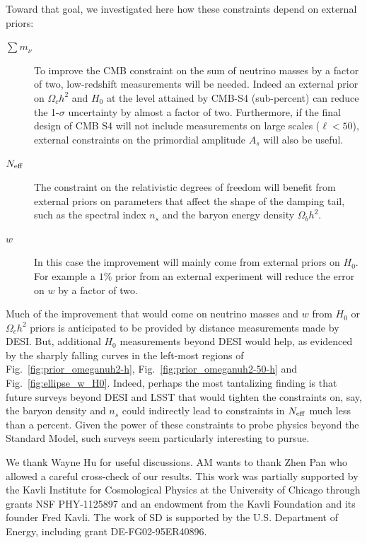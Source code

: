 \documentclass[aps,prd,reprint,superscriptaddress,nofootinbib]{revtex4-1}
\newcommand{\reffig}[1]{Fig.~\ref{fig:#1}}
\begin{document}
Toward that goal, we investigated here how these constraints depend on external priors:
\begin{description}
\item[$\sum m_\nu$] To improve the CMB constraint on the sum of neutrino masses by a factor of two, low-redshift measurements will be needed. Indeed an external prior on $\Omega_{c}h^{2}$ and $H_{0}$ at the level attained by CMB-S4 (sub-percent) can reduce the 1-$\sigma$ uncertainty by almost a factor of two.
Furthermore, if the final design of CMB S4 will not include measurements on large scales ($\ell<50$), external constraints on the primordial amplitude $A_{s}$ will also be useful. 
\item[$N_{\rm eff}$] The constraint on the relativistic degrees of freedom will benefit from external priors on parameters that affect the shape of the damping tail, such as the spectral index $n_s$ and the baryon energy density $\Omega_b h^2$.
\item[$w$] In this case the improvement will mainly come from external priors on $H_{0}$. For example a $1\%$ prior from an external experiment will reduce the error on $w$ by a factor of two.\end{description}

Much of the improvement that would come on neutrino masses and $w$ from $H_0$ or $\Omega_ch^2$ priors is anticipated to be provided by distance measurements made by DESI. But, additional $H_0$ measurements beyond DESI would help, as evidenced by the sharply falling curves in the left-most regions of \reffig{prior_omeganuh2-h}, \reffig{prior_omeganuh2-50-h} and \reffig{ellipse_w_H0}. Indeed, perhaps the most tantalizing finding is that future surveys beyond DESI and LSST \cite{lsst-dark-energy-science-collaboration:2012} that would tighten the constraints on, say, the baryon density and $n_s$ could indirectly lead to constraints in $N_{\rm eff}$ much less than a percent. Given the power of these constraints to probe physics beyond the Standard Model, such surveys seem particularly interesting to pursue.


\begin{acknowledgments}
We thank Wayne Hu for useful discussions. AM wants to thank Zhen Pan who allowed a careful cross-check of our results.
This work was partially supported by the Kavli Institute for Cosmological Physics at the University of Chicago through grants NSF PHY-1125897 and an endowment from the Kavli Foundation and its founder Fred Kavli.
The work of SD is supported by the U.S. Department of Energy, including grant DE-FG02-95ER40896.
\end{acknowledgments}


\end{document}
